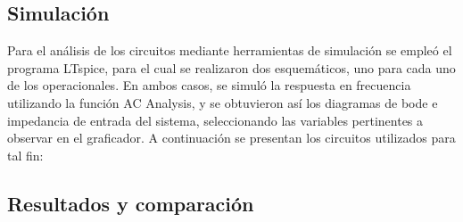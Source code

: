 \subsection{Simulación}
Para el análisis de los circuitos mediante herramientas de simulación se empleó el programa LTspice, para el cual se realizaron dos esquemáticos, uno para cada uno de los operacionales.
En ambos casos, se simuló la respuesta en frecuencia utilizando la función AC Analysis, y se obtuvieron así los diagramas de bode e impedancia de entrada del sistema, seleccionando las variables pertinentes a observar en el graficador.
A continuación se presentan los circuitos utilizados para tal fin:

\subsection{Resultados y comparación}
